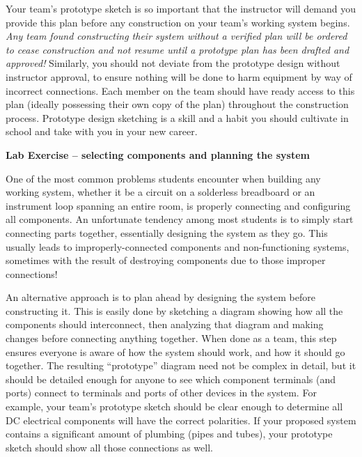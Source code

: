 Your team's prototype sketch is so important that the instructor will demand you provide this plan before any construction on your team's working system begins.  {\it Any team found constructing their system without a verified plan will be ordered to cease construction and not resume until a prototype plan has been drafted and approved!}  Similarly, you should not deviate from the prototype design without instructor approval, to ensure nothing will be done to harm equipment by way of incorrect connections.  Each member on the team should have ready access to this plan (ideally possessing their own copy of the plan) throughout the construction process.  Prototype design sketching is a skill and a habit you should cultivate in school and take with you in your new career.





\vfil \eject

\noindent
{\bf Lab Exercise -- selecting components and planning the system}

\vskip 5pt

One of the most common problems students encounter when building any working system, whether it be a circuit on a solderless breadboard or an instrument loop spanning an entire room, is properly connecting and configuring all components.  An unfortunate tendency among most students is to simply start connecting parts together, essentially designing the system as they go.  This usually leads to improperly-connected components and non-functioning systems, sometimes with the result of destroying components due to those improper connections!

An alternative approach is to plan ahead by designing the system before constructing it.  This is easily done by sketching a diagram showing how all the components should interconnect, then analyzing that diagram and making changes before connecting anything together.  When done as a team, this step ensures everyone is aware of how the system should work, and how it should go together.  The resulting ``prototype'' diagram need not be complex in detail, but it should be detailed enough for anyone to see which component terminals (and ports) connect to terminals and ports of other devices in the system.  For example, your team's prototype sketch should be clear enough to determine all DC electrical components will have the correct polarities.  If your proposed system contains a significant amount of plumbing (pipes and tubes), your prototype sketch should show all those connections as well.

